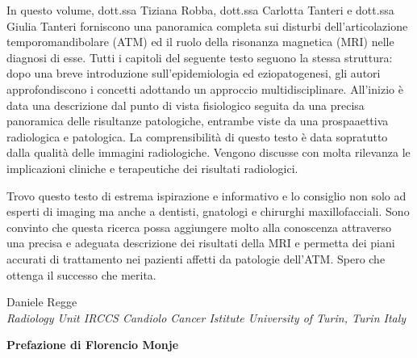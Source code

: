 \documentclass[10pt,twocolumn,a4paper]{article}
\begin{document}
	\vspace*{0.5cm}
	In questo volume, dott.ssa Tiziana Robba, dott.ssa Carlotta Tanteri e dott.ssa Giulia Tanteri forniscono una panoramica completa sui disturbi dell'articolazione temporomandibolare (ATM) ed il ruolo della risonanza magnetica (MRI) nelle diagnosi di esse.
	Tutti i capitoli del seguente testo seguono la stessa struttura: dopo una breve introduzione sull'epidemiologia ed eziopatogenesi, gli autori approfondiscono i concetti adottando un approccio multidisciplinare. All'inizio è data una descrizione dal punto di vista
	fisiologico seguita da una precisa panoramica delle risultanze patologiche, entrambe viste da una prospaaettiva radiologica e patologica. La comprensibilità di questo testo è data sopratutto dalla qualità delle immagini radiologiche. Vengono discusse con 
	molta rilevanza le implicazioni cliniche e terapeutiche dei risultati radiologici.\par Trovo questo testo di estrema ispirazione e informativo e lo consiglio non solo ad esperti di imaging ma anche a dentisti, gnatologi e chirurghi maxillofacciali. Sono convinto
	che questa ricerca possa aggiungere molto alla conoscenza attraverso una precisa e adeguata descrizione dei risultati della MRI e permetta dei piani accurati di trattamento nei pazienti affetti da patologie dell'ATM. Spero che ottenga il successo
	che merita.
	\begin{flushright}
		Daniele Regge\\
		\textit{\footnotesize{Radiology Unit IRCCS Candiolo Cancer Istitute University of Turin, Turin Italy}}
	\end{flushright}
	
	\newpage
	
	\textbf{\Large{Prefazione di Florencio Monje}}\\
	
\end{document}
